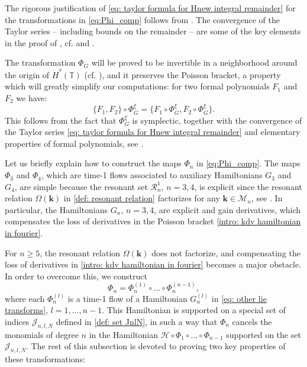 \documentclass[a4paper,10pt,reqno]{article}
\theoremstyle{definition}
\theoremstyle{plain}
\theoremstyle{plain}
\theoremstyle{definition}
\theoremstyle{plain}
\theoremstyle{plain}
\theoremstyle{plain}
\theoremstyle{definition}
\theoremstyle{definition}
\def \T{\mathbb{T}}
\def \H{\mathcal{H}}
\def \M{\mathcal{M}}
\def \k{\bm{k}}
\def \cR{\mathcal{R}}
\begin{document}
The rigorous justification of \eqref{eq: taylor formula for Hnew integral remainder} for the transformations in \eqref{eq:Phi_comp} follows from . 
The convergence of the Taylor series -- including bounds on the remainder -- are some of the key elements in the proof of , cf.  and .

The transformation $\Phi_G$ will be proved to be invertible in a neighborhood around the origin of $\dot{H}^s(\T)$ (cf. ), and it preserves the Poisson bracket, a property which will greatly simplify our computations: for two formal polynomials $F_1$ and $F_2$ we have:
\begin{equation}
\{ F_1,F_2 \} \circ \Phi_G^{\xi} = \{ F_1 \circ \Phi_G^{\xi}, F_2 \circ \Phi_G^{\xi} \}. 
\label{eq: hamiltonian flows preserve poisson structure}
\end{equation}
This follows from the fact that $\Phi_G^{\xi}$ is symplectic, together with the convergence of the Taylor series \eqref{eq: taylor formula for Hnew integral remainder} and elementary properties of formal polynomials, see .

\medskip

Let us briefly explain how to construct the maps $\Phi_n$ in \eqref{eq:Phi_comp}. The maps $\Phi_3$ and $\Phi_4$, which are time-1 flows associated to auxiliary Hamiltonians $G_3$ and $G_4$, are simple because the resonant set $\cR_n^1$, $n=3,4$, is explicit since the resonant relation $\Omega (\k)$ in \eqref{def: resonant relation} factorizes for any $\k \in \M_n$, see . In particular, the Hamiltonians $G_n$, $n=3,4$, are explicit and gain derivatives, which compensates the loss of derivatives in the Poisson bracket \eqref{intro: kdv hamiltonian in fourier}.

For $n\geq 5$, the resonant relation $\Omega (\k)$ does not factorize, and compensating the loss of derivatives in \eqref{intro: kdv hamiltonian in fourier} becomes a major obstacle. 
In order to overcome this, we construct 
\begin{equation}\label{eq:Phin}
    \Phi_n=\Phi_n^{(1)} \circ \ldots \circ \Phi_n^{(n-1)},
\end{equation} 
where each $\Phi_n^{(l)}$ is a time-1 flow of a Hamiltonian $G_n^{(l)}$ in \eqref{eq: other lie transforms}, $l=1,\ldots,n-1$. This Hamiltonian is supported on a special set of indices $\mathcal{J}_{n,l,N}$ defined in \eqref{def: set JnlN}, in such a way that $\Phi_n$ cancels the monomials of degree $n$ in the Hamiltonian $\H \circ \Phi_1\circ\ldots\circ\Phi_{n-1}$ supported on the set $\mathcal{J}_{n,l,N}$. The rest of this subsection is devoted to proving two key properties of these transformations:
\end{document}

